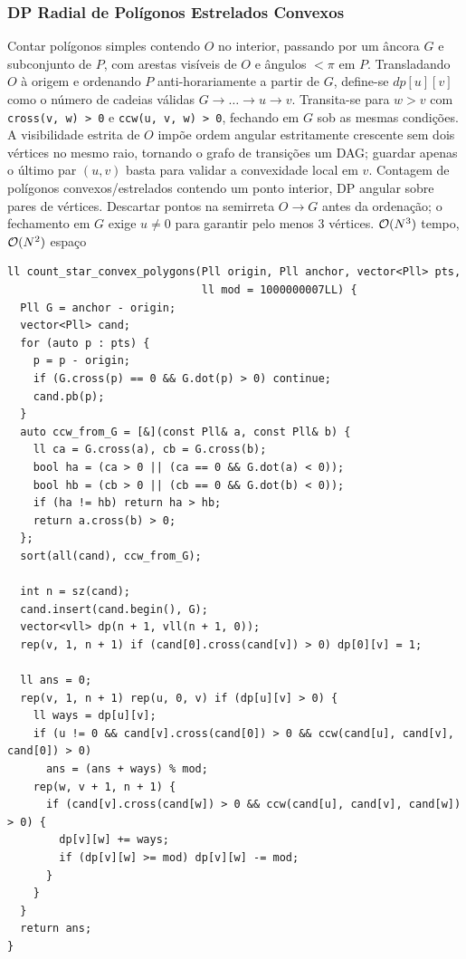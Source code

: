 \subsubsection{DP Radial de Polígonos Estrelados Convexos}
\algobox
  {Contar polígonos simples contendo $O$ no interior, passando por um âncora $G$ e subconjunto de $P$, com arestas visíveis de $O$ e ângulos $< \pi$ em $P$.}
  {Transladando $O$ à origem e ordenando $P$ anti-horariamente a partir de $G$, define-se $dp[u][v]$ como o número de cadeias válidas $G \to \dots \to u \to v$. Transita-se para $w > v$ com \texttt{cross(v, w) > 0} e \texttt{ccw(u, v, w) > 0}, fechando em $G$ sob as mesmas condições.}
  {A visibilidade estrita de $O$ impõe ordem angular estritamente crescente sem dois vértices no mesmo raio, tornando o grafo de transições um DAG; guardar apenas o último par $(u, v)$ basta para validar a convexidade local em $v$.}
  {Contagem de polígonos convexos/estrelados contendo um ponto interior, DP angular sobre pares de vértices.}
  {Descartar pontos na semirreta $O \to G$ antes da ordenação; o fechamento em $G$ exige $u \ne 0$ para garantir pelo menos $3$ vértices.}
  {$\mathcal{O}(N^3)$ tempo, $\mathcal{O}(N^2)$ espaço}

\begin{lstlisting}
ll count_star_convex_polygons(Pll origin, Pll anchor, vector<Pll> pts,
                              ll mod = 1000000007LL) {
  Pll G = anchor - origin;
  vector<Pll> cand;
  for (auto p : pts) {
    p = p - origin;
    if (G.cross(p) == 0 && G.dot(p) > 0) continue;
    cand.pb(p);
  }
  auto ccw_from_G = [&](const Pll& a, const Pll& b) {
    ll ca = G.cross(a), cb = G.cross(b);
    bool ha = (ca > 0 || (ca == 0 && G.dot(a) < 0));
    bool hb = (cb > 0 || (cb == 0 && G.dot(b) < 0));
    if (ha != hb) return ha > hb;
    return a.cross(b) > 0;
  };
  sort(all(cand), ccw_from_G);

  int n = sz(cand);
  cand.insert(cand.begin(), G);
  vector<vll> dp(n + 1, vll(n + 1, 0));
  rep(v, 1, n + 1) if (cand[0].cross(cand[v]) > 0) dp[0][v] = 1;

  ll ans = 0;
  rep(v, 1, n + 1) rep(u, 0, v) if (dp[u][v] > 0) {
    ll ways = dp[u][v];
    if (u != 0 && cand[v].cross(cand[0]) > 0 && ccw(cand[u], cand[v], cand[0]) > 0)
      ans = (ans + ways) % mod;
    rep(w, v + 1, n + 1) {
      if (cand[v].cross(cand[w]) > 0 && ccw(cand[u], cand[v], cand[w]) > 0) {
        dp[v][w] += ways;
        if (dp[v][w] >= mod) dp[v][w] -= mod;
      }
    }
  }
  return ans;
}
\end{lstlisting}

